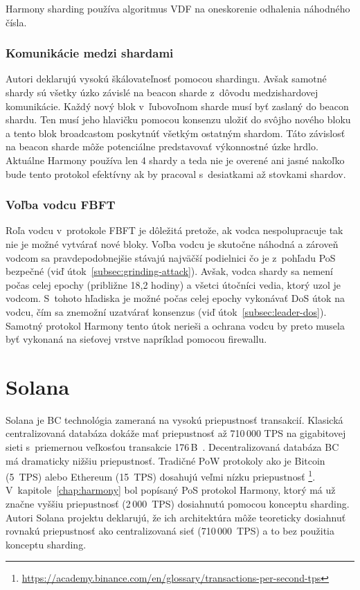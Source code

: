 Harmony sharding používa algoritmus VDF na oneskorenie odhalenia náhodného čísla. %

\subsection{Komunikácie medzi shardami}
Autori deklarujú vysokú škálovateľnosť pomocou shardingu. Avšak samotné shardy sú všetky úzko závislé na beacon sharde z~dôvodu medzishardovej komunikácie. Každý nový blok v~ľubovoľnom sharde musí byť zaslaný do beacon shardu. Ten musí jeho hlavičku pomocou konsenzu uložiť do svôjho nového bloku a tento blok broadcastom poskytnúť všetkým ostatným shardom. Táto závislosť na beacon sharde môže potenciálne predstavovať výkonnostné úzke hrdlo. Aktuálne Harmony používa len 4 shardy a teda nie je overené ani jasné nakoľko bude tento protokol efektívny ak by pracoval s~desiatkami až stovkami shardov.

\subsection{Voľba vodcu FBFT}
Roľa vodcu v~protokole FBFT je dôležitá pretože, ak vodca nespolupracuje tak nie je možné vytvárať nové bloky. Voľba vodcu je skutočne náhodná a zároveň vodcom sa pravdepodobnejšie stávajú najväčší podielnici čo je z~pohľadu PoS bezpečné (viď útok~\ref{subsec:grinding-attack}). Avšak, vodca shardy sa nemení počas celej epochy (približne 18,2 hodiny) a všetci útočníci vedia, ktorý uzol je vodcom. S~tohoto hľadiska je možné počas celej epochy vykonávať DoS útok na vodcu, čím sa znemožní uzatvárať konsenzus (viď útok~\ref{subsec:leader-dos}). Samotný protokol Harmony tento útok nerieši a ochrana vodcu by preto musela byť vykonaná na sieťovej vrstve napríklad pomocou firewallu.

\chapter{Solana}\label{chap:solana}

Solana je BC technológia zameraná na vysokú priepustnosť transakcií. Klasická centralizovaná databáza dokáže mať priepustnosť až 710\,000 TPS na gigabitovej sieti s~priemernou veľkosťou transakcie 176\,B~\cite{solanaDoc}. Decentralizovaná databáza BC má dramaticky nižšiu priepustnosť. Tradičné PoW protokoly ako je Bitcoin (5~TPS) alebo Ethereum (15~TPS) dosahujú veľmi nízku priepustnosť%
\footnote{\url{https://academy.binance.com/en/glossary/transactions-per-second-tps}}.  V~kapitole~\ref{chap:harmony} bol popísaný PoS protokol Harmony, ktorý má už značne vyššiu priepustnosť (2\,000~TPS) dosiahnutú pomocou konceptu sharding. Autori Solana projektu deklarujú, že ich architektúra môže teoreticky dosiahnuť rovnakú priepustnosť ako centralizovaná sieť (710\,000~TPS) a to bez použitia konceptu sharding.

